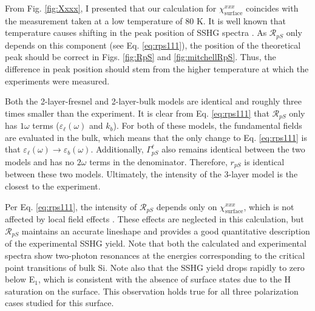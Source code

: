 From Fig. \ref{fig:Xxxx}, I presented that our calculation for
$\chi^{xxx}_{\mathrm{surface}}$ coincides with the measurement taken at a low
temperature of 80 K. It is well known that temperature causes shifting in the
peak position of SSHG spectra \cite{dadapPRB97}. As $\mathcal{R}_{pS}$ only
depends on this component (see Eq. \eqref{eq:rps111}), the position of the
theoretical peak should be correct in Figs. \ref{fig:RpS} and
\ref{fig:mitchellRpS}. Thus, the difference in peak position should stem from
the higher temperature at which the experiments were measured.

Both the 2-layer-fresnel and 2-layer-bulk models are identical and roughly three
times smaller than the experiment. It is clear from Eq. \eqref{eq:rps111} that
$\mathcal{R}_{pS}$ only has $1\omega$ terms ($\varepsilon_{\ell}(\omega)$ and
$k_{b}$). For both of these models, the fundamental fields are evaluated in the
bulk, which means that the only change to Eq. \eqref{eq:rps111} is that
$\varepsilon_{\ell}(\omega) \rightarrow \varepsilon_{b}(\omega)$. Additionally,
$\Gamma^{\ell}_{pS}$ also remains identical between the two models and has no
$2\omega$ terms in the denominator. Therefore, $r_{pS}$ is identical between
these two models. Ultimately, the intensity of the 3-layer model is the closest
to the experiment. 

Per Eq. \eqref{eq:rps111}, the intensity of $\mathcal{R}_{pS}$ depends only on
$\chi^{xxx}_{\mathrm{surface}}$, which is not affected by local field effects
\cite{tancognedejean:tel-01235611}. These effects are neglected in this
calculation, but $\mathcal{R}_{pS}$ maintains an accurate lineshape and provides
a good quantitative description of the experimental SSHG yield. Note that both
the calculated and experimental spectra show two-photon resonances at the
energies corresponding to the critical point transitions of bulk Si. Note also
that the SSHG yield drops rapidly to zero below E$_{1}$, which is consistent
with the absence of surface states due to the H saturation on the surface. This
observation holds true for all three polarization cases studied for this
surface.

